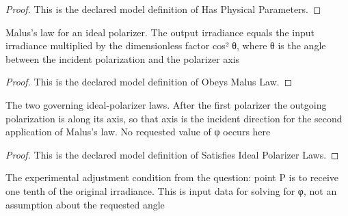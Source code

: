 \begin{proof}
  This is the declared model definition of Has Physical Parameters.
\end{proof}
\begin{definition}
  \label{def:physics:phyx-mini-0094:phyxminiproblems-problemphyxmini0094-obeysmaluslaw}
  Malus's law for an ideal polarizer. The output irradiance equals the input irradiance multiplied by the dimensionless factor cos² θ, where θ is the angle between the incident polarization and the polarizer axis
\end{definition}
\begin{proof}
  This is the declared model definition of Obeys Malus Law.
\end{proof}
\begin{definition}
  \label{def:physics:phyx-mini-0094:phyxminiproblems-problemphyxmini0094-satisfiesidealpolarizerlaws}
  The two governing ideal-polarizer laws. After the first polarizer the outgoing polarization is along its axis, so that axis is the incident direction for the second application of Malus's law. No requested value of φ occurs here
\end{definition}
\begin{proof}
  This is the declared model definition of Satisfies Ideal Polarizer Laws.
\end{proof}
\begin{definition}
  \label{def:physics:phyx-mini-0094:phyxminiproblems-problemphyxmini0094-hasrequestedirradianceatp}
  The experimental adjustment condition from the question: point P is to receive one tenth of the original irradiance. This is input data for solving for φ, not an assumption about the requested angle
\end{definition}
